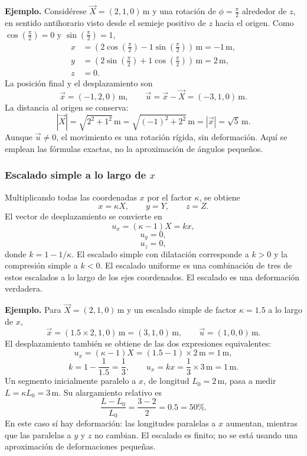 \textbf{Ejemplo.} Considérese $\vec X=(2,1,0)\,\mathrm{m}$ y una rotación de $\phi=\frac{\pi}{2}$ alrededor de $z$, en sentido antihorario visto desde el semieje positivo de $z$ hacia el origen. Como $\cos\left(\frac{\pi}{2}\right)=0$ y $\sin\left(\frac{\pi}{2}\right)=1$,
\[
\begin{aligned}
x&=(2\cos\left(\frac{\pi}{2}\right)-1\sin\left(\frac{\pi}{2}\right))\,\mathrm{m}=-1\,\mathrm{m},\\
y&=(2\sin\left(\frac{\pi}{2}\right)+1\cos\left(\frac{\pi}{2}\right))\,\mathrm{m}=2\,\mathrm{m},\\
z&=0.
\end{aligned}
\]
La posición final y el desplazamiento son
\[
\vec x=(-1,2,0)\,\mathrm{m},
\qquad
\vec u=\vec x-\vec X=(-3,1,0)\,\mathrm{m}.
\]
La distancia al origen se conserva:
\[
|\vec X|=\sqrt{2^2+1^2}\,\mathrm{m}
=\sqrt{(-1)^2+2^2}\,\mathrm{m}=|\vec x|=\sqrt5\,\mathrm{m}.
\]
Aunque $\vec u\ne0$, el movimiento es una rotación rígida, sin deformación. Aquí se emplean las fórmulas exactas, no la aproximación de ángulos pequeños.

\subsubsection{Escalado simple a lo largo de $x$}

Multiplicando todas las coordenadas $x$ por el factor $\kappa$, se obtiene
\[ x = \kappa X, \qquad y = Y, \qquad z = Z. \]
El vector de desplazamiento se convierte en
\[ u_x = (\kappa - 1)X = kx, \]
\[ u_y = 0, \]
\[ u_z = 0, \]
donde $k = 1 - 1/\kappa$. El escalado simple con dilatación corresponde a $k > 0$ y la compresión simple a $k < 0$. El escalado uniforme es una combinación de tres de estos escalados a lo largo de los ejes coordenados. El escalado es una deformación verdadera.

\textbf{Ejemplo.} Para $\vec X=(2,1,0)\,\mathrm{m}$ y un escalado simple de factor $\kappa=1.5$ a lo largo de $x$,
\[
\vec x=(1.5\times2,1,0)\,\mathrm{m}=(3,1,0)\,\mathrm{m},
\qquad
\vec u=(1,0,0)\,\mathrm{m}.
\]
El desplazamiento también se obtiene de las dos expresiones equivalentes:
\[
u_x=(\kappa-1)X=(1.5-1)\times2\,\mathrm{m}=1\,\mathrm{m},
\]
\[
k=1-\frac{1}{1.5}=\frac13,
\qquad
u_x=kx=\frac13\times3\,\mathrm{m}=1\,\mathrm{m}.
\]
Un segmento inicialmente paralelo a $x$, de longitud $L_0=2\,\mathrm{m}$, pasa a medir $L=\kappa L_0=3\,\mathrm{m}$. Su alargamiento relativo es
\[
\frac{L-L_0}{L_0}=\frac{3-2}{2}=0.5=50\%.
\]
En este caso sí hay deformación: las longitudes paralelas a $x$ aumentan, mientras que las paralelas a $y$ y $z$ no cambian. El escalado es finito; no se está usando una aproximación de deformaciones pequeñas.
